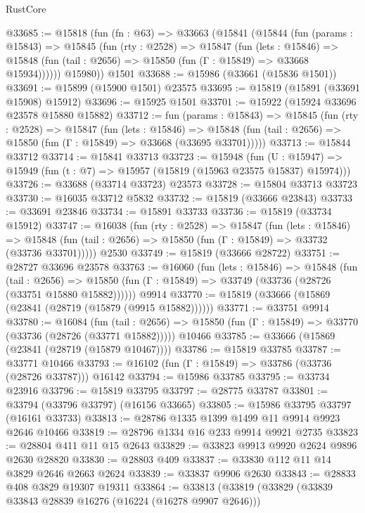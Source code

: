 \begin{lexlean}{RustCore}
\begin{coremodule}
@33685 := @15818
    (fun (fn : @63) =>
    @33663
      (@15841
        (@15844
          (fun (params : @15843) =>
          @15845
            (fun (rty : @2528) =>
            @15847
              (fun (lets : @15846) =>
              @15848 (fun (tail : @2656) => @15850 (fun (Γ : @15849) => @33668 @15934))))))
        @15980))
    @1501
@33688 := @15986 (@33661 (@15836 @1501))
@33691 := @15899 (@15900 @1501) @23575
@33695 := @15819 (@15891 (@33691 @15908) @15912)
@33696 := @15925 @1501
@33701 := @15922 (@15924 @33696 @23578 @15880 @15882)
@33712 := fun (params : @15843) =>
  @15845
    (fun (rty : @2528) =>
    @15847
      (fun (lets : @15846) =>
      @15848 (fun (tail : @2656) => @15850 (fun (Γ : @15849) => @33668 (@33695 @33701)))))
@33713 := @15844 @33712
@33714 := @15841 @33713
@33723 := @15948
    (fun (U : @15947) => @15949 (fun (t : @7) => @15957 (@15819 (@15963 @23575 @15837) @15974)))
@33726 := @33688 (@33714 @33723) @23573
@33728 := @15804 @33713 @33723
@33730 := @16035 @33712 @5832
@33732 := @15819 (@33666 @23843)
@33733 := @33691 @23846
@33734 := @15891 @33733
@33736 := @15819 (@33734 @15912)
@33747 := @16038
    (fun (rty : @2528) =>
    @15847
      (fun (lets : @15846) =>
      @15848 (fun (tail : @2656) => @15850 (fun (Γ : @15849) => @33732 (@33736 @33701)))))
    @2530
@33749 := @15819 (@33666 @28722)
@33751 := @28727 @33696 @23578
@33763 := @16060
    (fun (lets : @15846) =>
    @15848
      (fun (tail : @2656) =>
      @15850 (fun (Γ : @15849) => @33749 (@33736 (@28726 (@33751 @15880 @15882))))))
    @9914
@33770 := @15819 (@33666 (@15869 (@23841 (@28719 (@15879 (@9915 @15882))))))
@33771 := @33751 @9914
@33780 := @16084
    (fun (tail : @2656) => @15850 (fun (Γ : @15849) => @33770 (@33736 (@28726 (@33771 @15882)))))
    @10466
@33785 := @33666 (@15869 (@23841 (@28719 (@15879 @10467))))
@33786 := @15819 @33785
@33787 := @33771 @10466
@33793 := @16102 (fun (Γ : @15849) => @33786 (@33736 (@28726 @33787))) @16142
@33794 := @15986 @33785
@33795 := @33734 @23916
@33796 := @15819 @33795
@33797 := @28775 @33787
@33801 := @33794 (@33796 @33797) (@16156 @33665)
@33805 := @15986 @33795 @33797 (@16161 @33733)
@33813 := @28786 @1335 @1399 @1499 @11 @9914 @9923 @2646 @10466
@33819 := @28796 @1334 @16 @233 @9914 @9921 @2735
@33823 := @28804 @411 @11 @15 @2643
@33829 := @33823 @9913 @9920 @2624 @9896 @2630 @28820
@33830 := @28803 @409
@33837 := @33830 @112 @11 @14 @3829 @2646 @2663 @2624
@33839 := @33837 @9906 @2630
@33843 := @28833 @408 @3829 @19307 @19311
@33864 := @33813
    (@33819
      (@33829
        (@33839 @33843 @28839 @16276 (@16224 (@16278 @9907 @2646)))

\end{coremodule}
\end{lexlean}
